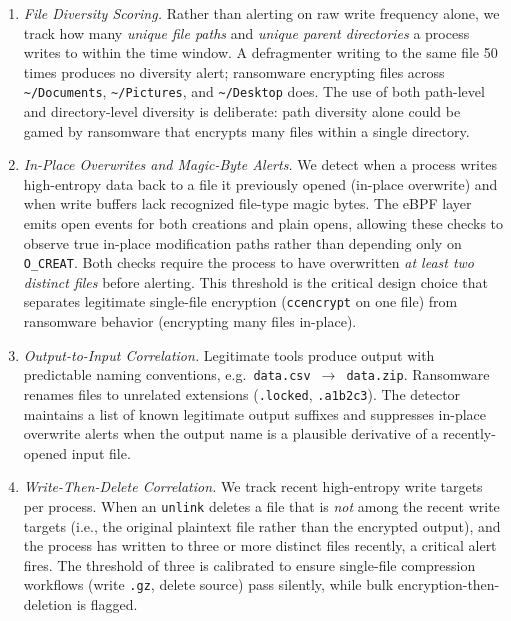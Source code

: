\documentclass[twocolumn, 10pt]{scrartcl}
\begin{document}
\begin{enumerate}
    (b) Ransomware targets user data, not system files. The business model depends on encrypting files the victim can't recreate — documents, photos, databases. System binaries and configs can be reinstalled. Real-world ransomware families (LockBit, Conti, BlackCat) overwhelmingly target \texttt{/home, /srv,} mounted shares, and database data directories, not \texttt{/dev/} or \texttt{/proc/}.

    \item \textit{File Diversity Scoring.}
    Rather than alerting on raw write frequency alone, we track how many 
    \emph{unique file paths} and \emph{unique parent directories} a process writes 
    to within the time window. A defragmenter writing to the same file 50 times 
    produces no diversity alert; ransomware encrypting files across 
    \texttt{\textasciitilde/Documents}, \texttt{\textasciitilde/Pictures}, and 
    \texttt{\textasciitilde/Desktop} does. The use of both path-level and 
    directory-level diversity is deliberate: path diversity alone could be gamed by 
    ransomware that encrypts many files within a single directory.

    \item \textit{In-Place Overwrites and Magic-Byte Alerts.}
    We detect when a process writes high-entropy data back to a file it previously 
    opened (in-place overwrite) and when write buffers lack recognized file-type 
    magic bytes. The eBPF layer emits open events for both creations and plain opens, 
    allowing these checks to observe true in-place modification paths rather than 
    depending only on \texttt{O\_CREAT}. Both checks require the process to have 
    overwritten \emph{at least two distinct files} before alerting. This threshold 
    is the critical design choice that separates legitimate single-file encryption 
    (\texttt{ccencrypt} on one file) from ransomware behavior (encrypting many files 
    in-place).

    \item \textit{Output-to-Input Correlation.}
    Legitimate tools produce output with predictable naming conventions, 
    e.g.\ \texttt{data.csv}~$\to$~\texttt{data.zip}. Ransomware renames files 
    to unrelated extensions (\texttt{.locked}, \texttt{.a1b2c3}). The detector 
    maintains a list of known legitimate output suffixes and suppresses in-place 
    overwrite alerts when the output name is a plausible derivative of a 
    recently-opened input file. 

    \item \textit{Write-Then-Delete Correlation.}
    We track recent high-entropy write targets per process. When an \texttt{unlink} 
    deletes a file that is \emph{not} among the recent write targets (i.e., the 
    original plaintext file rather than the encrypted output), and the process has 
    written to three or more distinct files recently, a critical alert fires. The 
    threshold of three is calibrated to ensure single-file compression workflows 
    (write \texttt{.gz}, delete source) pass silently, while bulk encryption-then-deletion is flagged. 
\end{enumerate}
\end{document}
